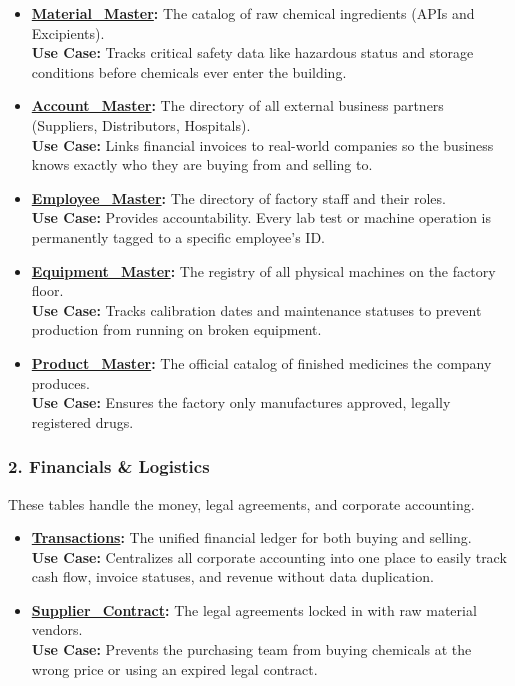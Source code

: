 \documentclass[12pt, a4paper]{article}
\begin{document}
\begin{itemize}
    \item[$\rightarrow$] \textbf{\underline{Material\_Master}:} The catalog of raw chemical ingredients (APIs and Excipients).
    \\ \textbf{Use Case:} Tracks critical safety data like hazardous status and storage conditions before chemicals ever enter the building.
    
    \item[$\rightarrow$] \textbf{\underline{Account\_Master}:} The directory of all external business partners (Suppliers, Distributors, Hospitals).
    \\ \textbf{Use Case:} Links financial invoices to real-world companies so the business knows exactly who they are buying from and selling to.
    
    \item[$\rightarrow$] \textbf{\underline{Employee\_Master}:} The directory of factory staff and their roles.
    \\ \textbf{Use Case:} Provides accountability. Every lab test or machine operation is permanently tagged to a specific employee's ID.
    
    \item[$\rightarrow$] \textbf{\underline{Equipment\_Master}:} The registry of all physical machines on the factory floor.
    \\ \textbf{Use Case:} Tracks calibration dates and maintenance statuses to prevent production from running on broken equipment.

    \item[$\rightarrow$] \textbf{\underline{Product\_Master}:} The official catalog of finished medicines the company produces.
    \\ \textbf{Use Case:} Ensures the factory only manufactures approved, legally registered drugs.
\end{itemize}

\subsubsection*{2. Financials \& Logistics}
These tables handle the money, legal agreements, and corporate accounting.

\begin{itemize}
    \item[$\rightarrow$] \textbf{\underline{Transactions}:} The unified financial ledger for both buying and selling.
    \\ \textbf{Use Case:} Centralizes all corporate accounting into one place to easily track cash flow, invoice statuses, and revenue without data duplication.
    
    \item[$\rightarrow$] \textbf{\underline{Supplier\_Contract}:} The legal agreements locked in with raw material vendors.
    \\ \textbf{Use Case:} Prevents the purchasing team from buying chemicals at the wrong price or using an expired legal contract.
\end{itemize}
\end{document}
